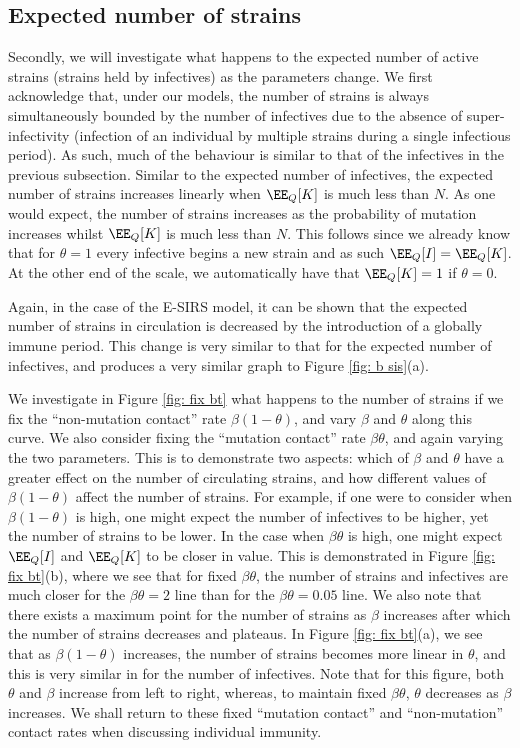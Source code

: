 \documentclass[smallextended]{svjour3}       %
\begin{document}
\subsection{Expected number of strains}\label{subsec: strains}
Secondly, we will investigate what happens to the expected number of active strains (strains held by infectives) as the parameters change. We first acknowledge that, under our models, the number of strains is always simultaneously bounded by the number of infectives due to the absence of super-infectivity (infection of an individual by multiple strains during a single infectious period). As such, much of the behaviour is similar to that of the infectives in the previous subsection. Similar to the expected number of infectives, the expected number of strains increases linearly when $\EE_Q[K]$ is much less than $N$. 
As one would expect, the number of strains increases as the probability of mutation increases whilst $\EE_Q[K]$ is much less than $N$. This follows since we already know that for $\theta = 1$ every infective begins a new strain and as such $\EE_Q[I] = \EE_Q[K]$. At the other end of the scale, we automatically have that $\EE_Q[K] = 1$ if $\theta = 0$.

Again, in the case of the E-SIRS model, it can be shown that the expected number of strains in circulation is decreased by the introduction of a globally immune period. This change is very similar to that for the expected number of infectives, and produces a very similar graph to Figure \ref{fig: b sis}(a).

We investigate in Figure \ref{fig: fix bt} what happens to the number of strains if we fix the ``non-mutation contact'' rate $\beta (1-\theta)$, and vary $\beta$ and $\theta$ along this curve. We also consider fixing the ``mutation contact'' rate $\beta \theta$, and again varying the two parameters. This is to demonstrate two aspects: which of $\beta$ and $\theta$ have a greater effect on the number of circulating strains, and how different values of $\beta(1-\theta)$ affect the number of strains. 
For example, if one were to consider when $\beta(1-\theta)$ is high, one might expect the number of infectives to be higher, yet the number of strains to be lower. In the case when $\beta\theta$ is high, one might expect $\EE_Q[I]$ and $\EE_Q[K]$ to be closer in value. This is demonstrated in Figure \ref{fig: fix bt}(b), where we see that for fixed $\beta\theta$, the number of strains and infectives are much closer for the $\beta\theta = 2$ line than for the $\beta\theta = 0.05$ line.  
We also note that there exists a maximum point for the number of strains as $\beta$ increases after which the number of strains decreases and plateaus. In Figure \ref{fig: fix bt}(a), we see that as $\beta(1-\theta)$ increases, the number of strains becomes more linear in $\theta$, and this is very similar in for the number of infectives. Note that for this figure, both $\theta$ and $\beta$ increase from left to right, whereas, to maintain fixed $\beta\theta$, $\theta$ decreases as $\beta$ increases. We shall return to these fixed ``mutation contact'' and ``non-mutation'' contact rates when discussing individual immunity.
\end{document}
